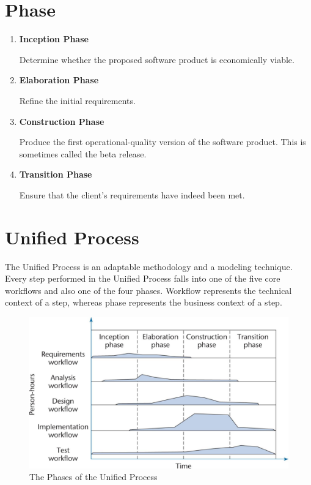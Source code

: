 \documentclass[11pt]{article}
\begin{document}
\section*{Phase}

\begin{enumerate}

	\item \textbf{Inception Phase}
	
	Determine whether the proposed software product is economically viable.
	
	\item \textbf{Elaboration Phase}
	
	Refine the initial requirements.
	
	\item \textbf{Construction Phase}
	
	Produce the first operational-quality version of the software product. This is sometimes called the beta release.
	
	\item \textbf{Transition Phase}
	
	Ensure that the client’s requirements have indeed been met.
	
\end{enumerate}


\section*{Unified Process}

The Unified Process is an adaptable methodology and a modeling technique. Every step performed in the Unified Process falls into one of the five core workflows and also one of the four phases. Workflow represents the technical context of a step, whereas phase represents the business context of a step.

\begin{figure}[h]
	\centering
	\includegraphics[width=0.9\linewidth]{images/UnifiedProcess.png}
	\caption{The Phases of the Unified Process}
	\label{fig:UnifiedProcess}
\end{figure}
\end{document}
